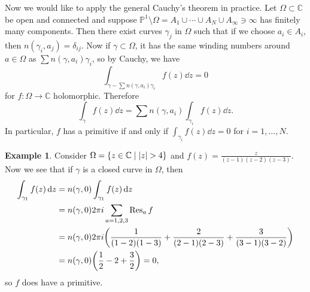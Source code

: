 \documentclass[leqno, openany]{memoir}
\theoremstyle{definition}
\newtheorem{exm}[thm]{Example}
\theoremstyle{remark}
\theoremstyle{plain}
\theoremstyle{definition}
\theoremstyle{remark}
\newcommand{\C}{\mathbb{C}}
\renewcommand{\P}{\mathbb{P}}
\begin{document}
Now we would like to apply the general Cauchy's theorem in practice. Let
$\Omega \subset \C$ be open and connected and suppose $\P^1 \setminus \Omega =
A_1 \cup \cdots \cup A_N \cup A_{\infty} \ni \infty$ has finitely many
components. Then there exist curves $\gamma_j$ in $\Omega$ such that if we
choose $a_i \in A_i$, then $n(\gamma_i, a_j) = \delta_{ij}$. Now if $\gamma
\subset \Omega$, it has the same winding numbers around $a \in \Omega$ as $\sum
n(\gamma, a_i) \gamma_i$, so by Cauchy, we have \[ \int_{\gamma - \sum
n(\gamma, a_i) \gamma_i} f(z) \dd{z} = 0 \] for $f \colon \Omega \to \C$
holomorphic. Therefore \[ \int_{\gamma} f(z) \dd{z} = \sum n(\gamma, a_i)
\int_{\gamma_i} f(z) \dd{z}. \] In particular, $f$ has a primitive if and only
if $\int_{\gamma_i} f(z) \dd{z} = 0$ for $i = 1, \ldots, N$.

\begin{exm} Consider $\Omega = \qty{z \in \C \mid \abs{z} > 4}$ and $f(z) =
    \frac{z}{(z-1)(z-2)(z-3)}$. Now we see that if $\gamma$ is a closed curve
    in $\Omega$, then \begin{align*} \int_{\gamma_1} f(z) \dd{z} &= n(\gamma,
        0) \int_{\gamma_1} f(z) \dd{z} \\ &= n(\gamma, 0) 2 \pi i
        \sum_{a=1,2,3} \Res_a f \\ &= n(\gamma, 0) 2 \pi i
        \qty(\frac{1}{(1-2)(1-3)} + \frac{2}{(2-1)(2-3)} +
        \frac{3}{(3-1)(3-2)}) \\ &= n(\gamma, 0) \qty(\frac{1}{2} - 2 +
        \frac{3}{2}) = 0, \end{align*} so $f$ does have a primitive.  \end{exm}
\end{document}
